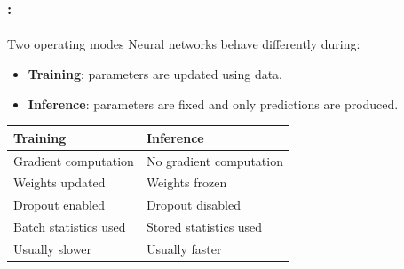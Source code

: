 \documentclass[xcolor=table]{beamer}
\begin{document}
\begin{frame}
	\frametitle{\insertshortsubtitle: \insertsection}
	\framesubtitle{\insertsubsection}
	
	\begin{exampleblock}{Two operating modes}
		Neural networks behave differently during:
		\begin{itemize}
			\item \textbf{Training}: parameters are updated using data.
			\item \textbf{Inference}: parameters are fixed and only predictions are produced.
		\end{itemize}
	\end{exampleblock}
	
	\vspace{0.3cm}
	
	\begin{table}[]
		\centering
		\begin{tabular}{p{4cm} p{4cm}}
			\hline
			\textbf{Training} & \textbf{Inference} \\
			\hline
			Gradient computation & No gradient computation \\
			Weights updated & Weights frozen \\
			Dropout enabled & Dropout disabled \\
			Batch statistics used & Stored statistics used \\
			Usually slower & Usually faster \\
			\hline
		\end{tabular}
	\end{table}
	
\end{frame}
\end{document}
